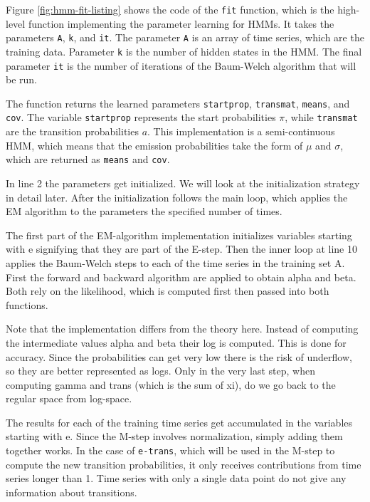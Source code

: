 Figure \ref{fig:hmm-fit-listing} shows the code of the \texttt{fit} function, which is the high-level function implementing the parameter learning for HMMs. It takes the parameters \texttt{A}, \texttt{k}, and \texttt{it}. The parameter \texttt{A} is an array of time series, which are the training data. Parameter \texttt{k} is the number of hidden states in the HMM. The final parameter \texttt{it} is the number of iterations of the Baum-Welch algorithm that will be run. 

The function returns the learned parameters \texttt{startprop}, \texttt{transmat}, \texttt{means}, and \texttt{cov}. The variable \texttt{startprop} represents the start probabilities $\pi$, while \texttt{transmat} are the transition probabilities $a$. This implementation is a semi-continuous HMM, which means that the emission probabilities take the form of $\mu$ and $\sigma$, which are returned as \texttt{means} and \texttt{cov}.

In line 2 the parameters get initialized. We will look at the initialization strategy in detail later. After the initialization follows the main loop, which applies the EM algorithm to the parameters the specified number of times. 

The first part of the EM-algorithm implementation initializes variables starting with e signifying that they are part of the E-step. Then the inner loop at line 10 applies the Baum-Welch steps to each of the time series in the training set A. First the forward and backward algorithm are applied to obtain alpha and beta. Both rely on the likelihood, which is computed first then passed into both functions. 

Note that the implementation differs from the theory here. Instead of computing the intermediate values alpha and beta their log is computed. This is done for accuracy. Since the probabilities can get very low there is the risk of underflow, so they are better represented as logs. Only in the very last step, when computing gamma and trans (which is the sum of xi), do we go back to the regular space from log-space. 

The results for each of the training time series get accumulated in the variables starting with e. Since the M-step involves normalization, simply adding them together works. In the case of \texttt{e-trans}, which will be used in the M-step to compute the new transition probabilities, it only receives contributions from time series longer than 1. Time series with only a single data point do not give any information about transitions.

